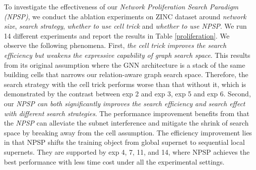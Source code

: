 To investigate the effectiveness of our \emph{Network Proliferation Search Paradigm (NPSP)}, we conduct the ablation experiments on ZINC dataset around \emph{network size}, \emph{search strategy}, \emph{whether to use cell trick} and \emph{whether to use NPSP}. 
We run 14 different experiments and report the results in Table \ref{proliferation}. 
We observe the following phenomena. 
First, \emph{the cell trick improves the search efficiency but weakens the expressive capability of graph search space}.
This results from its original assumption where the GNN architecture is a stack of the same building cells that narrows our relation-aware graph search space. 
Therefore, the search strategy with the cell trick performs worse than that without it, which is demonstrated by the contrast between exp 2 and exp 3, exp 5 and exp 6. 
Second, our \emph{NPSP can both significantly improves the search efficiency and search effect with different search strategies}. 
The performance improvement benefits from that the \emph{NPSP} can alleviate the subnet interference and mitigate the shrink of search space by breaking away from the cell assumption. 
The efficiency improvement lies in that NPSP shifts the training object from global supernet to sequential local supernets. 
They are supported by exp 4, 7, 11, and 14, where NPSP achieves the best performance with less time cost under all the experimental settings. 











